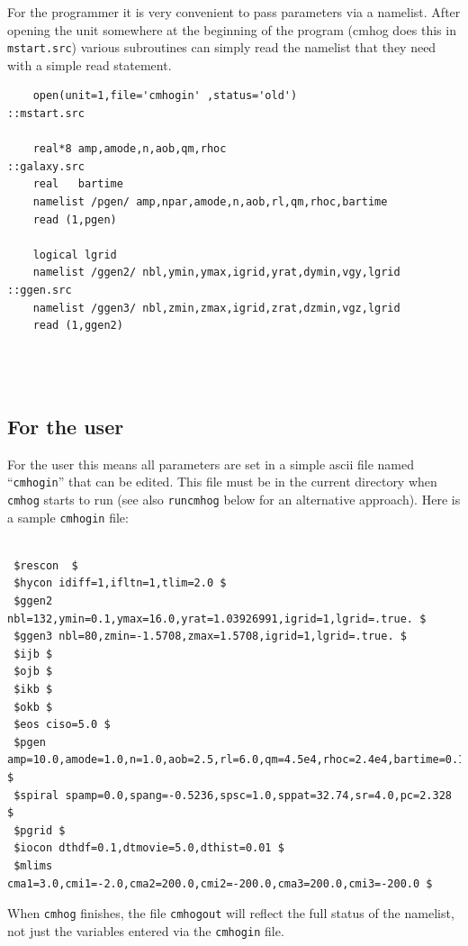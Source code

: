 \documentclass[10pt,dvips]{article}
\begin{document}
For the programmer it is very convenient to pass parameters via a namelist.
After opening the unit somewhere at the beginning of the program
(cmhog does this in {\tt mstart.src}) various subroutines can simply read
the namelist  that they need with a simple read statement.

\begin{verbatim}
    open(unit=1,file='cmhogin' ,status='old')                    ::mstart.src

    real*8 amp,amode,n,aob,qm,rhoc                               ::galaxy.src
    real   bartime
    namelist /pgen/ amp,npar,amode,n,aob,rl,qm,rhoc,bartime       
    read (1,pgen)                                                 

    logical lgrid
    namelist /ggen2/ nbl,ymin,ymax,igrid,yrat,dymin,vgy,lgrid    ::ggen.src
    namelist /ggen3/ nbl,zmin,zmax,igrid,zrat,dzmin,vgz,lgrid
    read (1,ggen2)




\end{verbatim}

\subsection{For the user}

For the user this means all parameters are set in a simple ascii file
named ``{\tt cmhogin}'' that can be edited. This file must be in the
current directory when {\tt cmhog} starts to run (see also
{\tt runcmhog} below for an alternative approach). Here is a sample
{\tt cmhogin} file:

\begin{verbatim}

 $rescon  $
 $hycon idiff=1,ifltn=1,tlim=2.0 $
 $ggen2 nbl=132,ymin=0.1,ymax=16.0,yrat=1.03926991,igrid=1,lgrid=.true. $
 $ggen3 nbl=80,zmin=-1.5708,zmax=1.5708,igrid=1,lgrid=.true. $
 $ijb $
 $ojb $
 $ikb $
 $okb $
 $eos ciso=5.0 $
 $pgen amp=10.0,amode=1.0,n=1.0,aob=2.5,rl=6.0,qm=4.5e4,rhoc=2.4e4,bartime=0.1 $
 $spiral spamp=0.0,spang=-0.5236,spsc=1.0,sppat=32.74,sr=4.0,pc=2.328 $
 $pgrid $
 $iocon dthdf=0.1,dtmovie=5.0,dthist=0.01 $
 $mlims cma1=3.0,cmi1=-2.0,cma2=200.0,cmi2=-200.0,cma3=200.0,cmi3=-200.0 $

\end{verbatim}

When {\tt cmhog} finishes, the file {\tt cmhogout} will reflect the full
status of the namelist, not just the variables entered via the {\tt cmhogin}
file. 
\end{document}
